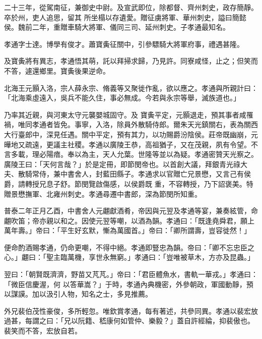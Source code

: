 \begin{pinyinscope}
 二十三年，從駕南征，兼御史中尉。及宣武即位，除都督、齊州刺史，政存簡靜。卒於州，吏人追思，留其
 所坐榻以存遺愛。贈征虜將軍、華州刺史，謚曰簡懿侯。魏前二年，重贈車騎大將軍、儀同三司、延州刺史。子孝通最知名。



 孝通字士達。博學有俊才。蕭寶夤征關中，引參驃騎大將軍府事，禮遇甚隆。



 及寶夤將有異志，孝通悟其萌，託以拜掃求歸，乃見許。同寮咸怪，止之；但笑而不答，遽還鄉里。寶夤後果逆命。



 北海王元顥入洛，宗人薛永宗、脩義等又聚徙作亂，欲以應之。孝通與所親計曰：「北海乘虛遠入，吳兵不能久住，事必無成。今若與永宗等舉，滅族道也。」



 乃率其近親，與河東太守元襲嬰城固守。及
 寶夤平定，元顥退走，預其事者咸罹禍，唯同孝通者皆免。事寧，入洛，除員外散騎侍郎。爾朱天光鎮關右，表為關西大行臺郎中，深見任遇。關中平定，預有其力，以功賜爵汾陰侯。莊帝既幽崩，元曄地又疏遠，更議主社稷。孝通以廣陵王恭，高祖猶子，又在茂親，夙有令望。不言多載，理必陽瘖。奉以為主，天人允葉。世隆等並以為疑。孝通密贊天光察之。廣陵王曰：「天何言哉？」於是定冊，即節閔帝也。以首創大議，拜銀青光祿大夫、散騎常侍，兼中書舍人，封藍田縣子。孝通求以官贈亡兄景懋，又言己有侯爵，請轉授兄息子舒。節閔覽啟傷感，以侯爵既
 重，不容轉授，乃下詔褒美。特贈景懋撫軍、北雍州刺史。孝通尋遷中書郎，深為節閔所知重。



 普泰二年正月乙酉，中書舍人元翽獻酒肴，帝因與元翌及孝通等宴，兼奏絃管，命翽吹笛；帝亦親以和之。因使元翌等嘲，以酒為韻。孝通曰：「既逢堯舜君，願上萬年壽。」帝曰：「平生好玄默，慚為萬國首。」帝曰：「卿所謂壽，豈容徙然！」



 便命酌酒賜孝通，仍命更嘲，不得中絕。孝通即豎忠為韻。帝曰：「卿不忘忠臣之心。」翽曰：「聖主臨萬機，享世永無窮。」孝通曰：「豈唯被草木，方亦及昆蟲。」



 翌曰：「朝賢既濟濟，野苗又芃芃。」帝曰：「君臣體魚水，書軌一華戎。」孝通曰：「微臣信慶渥，何
 以答華嵩？」于時，孝通內典機密，外參朝政，軍國動靜，預以謀謨。加以汲引人物，知名之士，多見推薦。



 外兄裴伯茂性豪俊，多所輕忽。唯欽賞孝通，每有著述，共參同異。孝通以裴宏放過甚，每謂之曰：「兄以阮籍、嵇康何如管仲、樂毅？」蓋自許經綸，抑裴傲也。裴笑而不答，宏放自若。




\end{pinyinscope}
